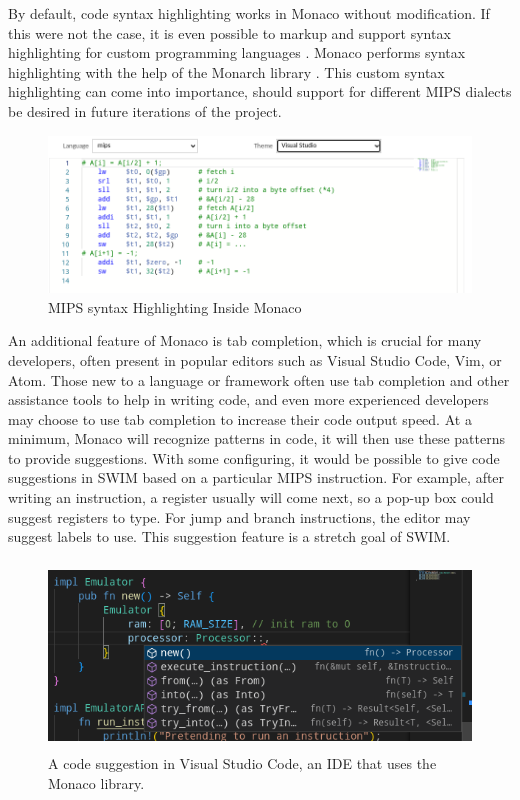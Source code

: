 \documentclass[
    paper=letter,
    parskip=half,
    fontsize=12pt,
    titlepage=firstiscover,
    toc=bibliography,
    numbers=endperiod
]{scrartcl}
\begin{document}
By default, code syntax highlighting works in Monaco without
modification. If this were not the case, it is even possible to markup
and support syntax highlighting for custom programming languages \cite{monaco-custom-languages}. Monaco
performs syntax highlighting with the help of the Monarch library \cite{monarch}. This
custom syntax highlighting can come into importance, should support for
different MIPS dialects be desired in future iterations of the project.

\begin{figure}[H]
    \includegraphics[width=\textwidth]{monaco-mips-syntax-highlighting}
    \caption{MIPS syntax Highlighting Inside Monaco}
\end{figure}

An additional feature of Monaco is tab completion, which is crucial for
many developers, often present in popular editors such as Visual Studio
Code, Vim, or Atom. Those new to a language or framework often use tab
completion and other assistance tools to help in writing code, and even
more experienced developers may choose to use tab completion to increase
their code output speed. At a minimum, Monaco will recognize patterns in
code, it will then use these patterns to provide suggestions. With some
configuring, it would be possible to give code suggestions in SWIM based
on a particular MIPS instruction. For example, after writing an
instruction, a register usually will come next, so a pop-up box could
suggest registers to type. For jump and branch instructions, the editor
may suggest labels to use. This suggestion feature is a stretch goal of
SWIM.

\begin{figure}[H]
    \includegraphics[height=5cm]{monaco-suggestions}
    \caption{A code suggestion in Visual Studio Code, an IDE that uses the Monaco library.}
\end{figure}
\end{document}
